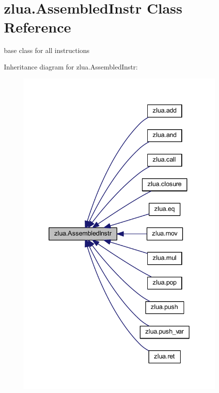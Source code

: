 \hypertarget{classzlua_1_1_assembled_instr}{}\section{zlua.\+Assembled\+Instr Class Reference}
\label{classzlua_1_1_assembled_instr}


base class for all instructions  




Inheritance diagram for zlua.\+Assembled\+Instr\+:
\nopagebreak
\begin{figure}[H]
\begin{center}
\leavevmode
\includegraphics[width=297pt]{classzlua_1_1_assembled_instr__inherit__graph}
\end{center}
\end{figure}
